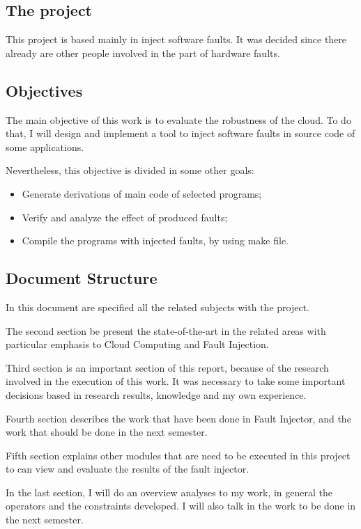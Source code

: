 
\subsection{The project}

This project is based mainly in inject software faults. It was decided since there already are other people involved in the part of hardware faults.

\subsection{Objectives}

The main objective of this work is to evaluate the robustness of the cloud. To do that, I will design and implement a tool to inject software faults in source code of some applications.

Nevertheless, this objective is divided in some other goals:

\begin{itemize}
	\item Generate derivations of main code of selected programs;
	\item Verify and analyze the effect of produced faults;
	\item Compile the programs with injected faults, by using make file.
\end{itemize}


\subsection{Document Structure}

In this document are specified all the related subjects with the project.

The second section be present the state-of-the-art in the related areas with particular emphasis to Cloud Computing and Fault Injection.

Third section is an important section of this report, because of the research involved in the execution of this work. It was necessary to take some important decisions based in research results, knowledge and my own experience.

Fourth section describes the work that have been done in Fault Injector, and the work that should be done in the next semester.

Fifth section explains other modules that are need to be executed in this project to can view and evaluate the results of the fault injector.

In the last section, I will do an overview analyses to my work, in general the operators and the constraints developed. I will also talk in the work to be done in the next semester.

